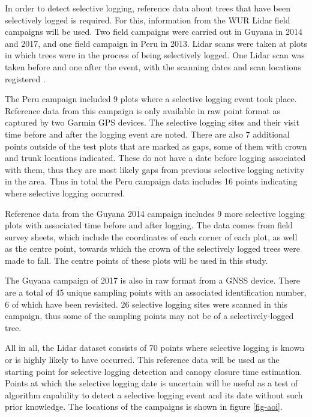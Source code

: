 \documentclass[a4paper,10pt]{article}
\begin{document}
In order to detect selective logging, reference data about trees that have been selectively logged is required. For this, information from the \ac{WUR} Lidar field campaigns will be used. Two field campaigns were carried out in Guyana in 2014 and 2017, and one field campaign in Peru in 2013. Lidar scans were taken at plots in which trees were in the process of being selectively logged. One Lidar scan was taken before and one after the event, with the scanning dates and scan locations registered \citep{gonzalez_de_tanago_menaca_estimation_2017}.

The Peru campaign included 9 plots where a selective logging event took place. Reference data from this campaign is only available in raw point format as captured by two Garmin \ac{GPS} devices. The selective logging sites and their visit time before and after the logging event are noted. There are also 7 additional points outside of the test plots that are marked as gaps, some of them with crown and trunk locations indicated. These do not have a date before logging associated with them, thus they are most likely gaps from previous selective logging activity in the area. Thus in total the Peru campaign data includes 16 points indicating where selective logging occurred.

Reference data from the Guyana 2014 campaign includes 9 more selective logging plots with associated time before and after logging. The data comes from field survey sheets, which include the coordinates of each corner of each plot, as well as the centre point, towards which the crown of the selectively logged trees were made to fall. The centre points of these plots will be used in this study.

The Guyana campaign of 2017 is also in raw format from a \ac{GNSS} device. There are a total of 45 unique sampling points with an associated identification number, 6 of which have been revisited. 26 selective logging sites were scanned in this campaign, thus some of the sampling points may not be of a selectively-logged tree.

All in all, the Lidar dataset consists of 70 points where selective logging is known or is highly likely to have occurred. This reference data will be used as the starting point for selective logging detection and canopy closure time estimation. Points at which the selective logging date is uncertain will be useful as a test of algorithm capability to detect a selective logging event and its date without such prior knowledge. The locations of the campaigns is shown in figure \ref{fig-aoi}.
\end{document}
